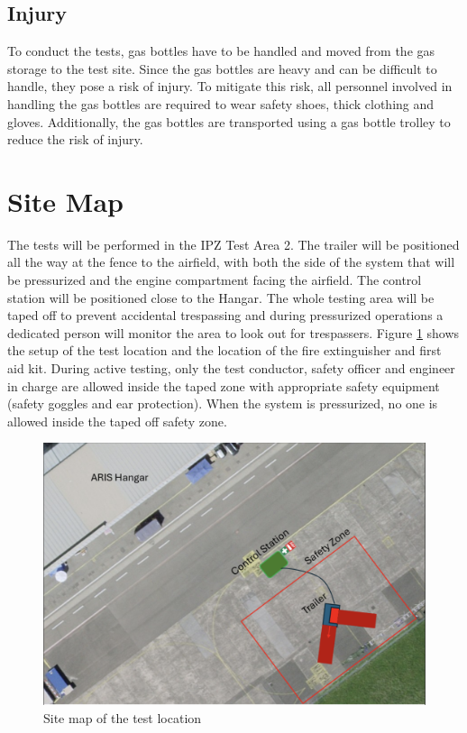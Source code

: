 \documentclass{article}
\begin{document}
\subsection{Injury}
To conduct the tests, gas bottles have to be handled and moved from the gas storage to the test site. Since the gas bottles are heavy and can be difficult to handle, they pose a risk of injury. To mitigate this risk, all personnel involved in handling the gas bottles are required to wear safety shoes, thick clothing and gloves. Additionally, the gas bottles are transported using a gas bottle trolley to reduce the risk of injury.

\section{Site Map}
The tests will be performed in the IPZ Test Area 2. The trailer will be positioned all the way at the fence to the airfield, with both the side of the system that will be pressurized and the engine compartment facing the airfield. The control station will be positioned close to the Hangar. The whole testing area will be taped off to prevent accidental trespassing and during pressurized operations a dedicated person will monitor the area to look out for trespassers.
Figure \ref{fig:location-plan} shows the setup of the test location and the location of the fire extinguisher and first aid kit. During active testing, only the test conductor, safety officer and engineer in charge are allowed inside the taped zone with appropriate safety equipment (safety goggles and ear protection). When the system is pressurized, no one is allowed inside the taped off safety zone.
\begin{figure}[h]
    \centering
    \includegraphics[width=\textwidth]{assets/location-map.png}
    \caption{Site map of the test location}
    \label{fig:location-plan}
\end{figure}
\end{document}
